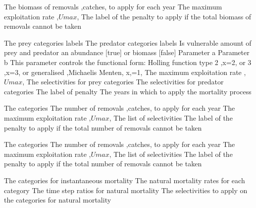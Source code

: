  {The biomass of removals ,catches, to apply for each year}
 {The maximum exploitation rate ,$Umax$,}
 {The label of the penalty to apply if the total biomass of removals cannot be taken}
\par\textbf{}\par
{} {The prey categories labels}
 {The predator categories labels}
 {Is vulnerable amount of prey and predator an abundance [true] or biomass [false]}
 {Parameter a}
 {Parameter b}
 {This parameter controls the functional form: Holling function type 2 ,x=2, or 3 ,x=3, or generalised ,Michaelis Menten, x,=1,}
 {The maximum exploitation rate ,$Umax$,}
 {The selectivities for prey categories}
 {The selectivities for predator categories}
 {The label of penalty}
 {The years in which to apply the mortality process}
\par\textbf{}\par
{} {The categories}
 {The number of removals ,catches, to apply for each year}
 {The maximum exploitation rate ,$Umax$,}
 {The list of selectivities}
 {The label of the penalty to apply if the total number of removals cannot be taken}
\par\textbf{}\par
{} {The categories}
 {The number of removals ,catches, to apply for each year}
 {The maximum exploitation rate ,$Umax$,}
 {The list of selectivities}
 {The label of the penalty to apply if the total number of removals cannot be taken}
\par\textbf{}\par
{} {The categories for instantaneous mortality}
 {The natural mortality rates for each category}
 {The time step ratios for natural mortality}
 {The selectivities to apply on the categories for natural mortality}
\par\textbf{}\par
